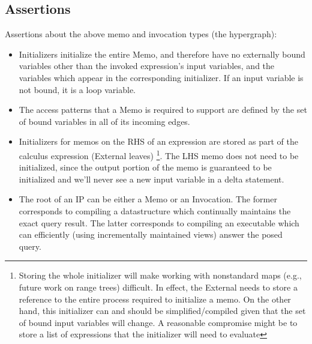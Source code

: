 \documentclass[11pt]{amsart}
\begin{document}
\subsection{Assertions}
Assertions about the above memo and invocation types (the hypergraph):
\begin{itemize}
\item Initializers initialize the entire Memo, and therefore have no externally bound variables other than the invoked expression's input variables, and the variables which appear in the corresponding initializer.  If an input variable is not bound, it is a loop variable.

\item The access patterns that a Memo is required to support are defined by the set of bound variables in all of its incoming edges.

\item Initializers for memos on the RHS of an expression are stored as part of the calculus expression (External leaves) \footnote{Storing the whole initializer will make working with nonstandard maps (e.g., future work on range trees) difficult.  In effect, the External needs to store a reference to the entire process required to initialize a memo.  On the other hand, this initializer can and should be simplified/compiled given that the set of bound input variables will change.  A reasonable compromise might be to store a list of expressions that the initializer will need to evaluate}.  The LHS memo does not need to be initialized, since the output portion of the memo is guaranteed to be initialized and we'll never see a new input variable in a delta statement.

\item The root of an IP can be either a Memo or an Invocation.  The former corresponds to compiling a datastructure which continually maintains the exact query result.  The latter corresponds to compiling an executable which can efficiently (using incrementally maintained views) answer the posed query.

\end{itemize}
\end{document}
